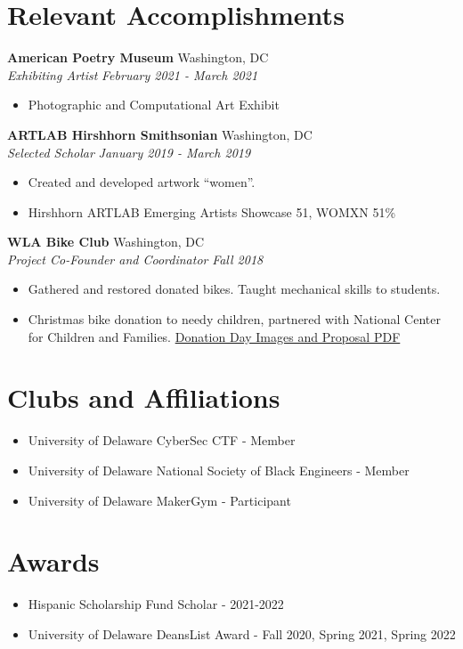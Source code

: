 \documentclass[letterpaper,10.5pt]{article}
\newcommand{\entry}[4]{%
  \vspace{2pt}
  \noindent\textbf{#1} \hfill #2 \\
  \noindent\textit{#3} \hfill \textit{#4}\par
  \vspace{-2pt}
}
\begin{document}
\section{Relevant Accomplishments}
\entry{American Poetry Museum}{Washington, DC}
      {Exhibiting Artist}{February 2021 - March 2021}
      \begin{itemize}
        \item Photographic and Computational Art Exhibit
      \end{itemize}
\entry{ARTLAB Hirshhorn Smithsonian}{Washington, DC}
      {Selected Scholar}{January 2019 - March 2019}
      \begin{itemize}
        \item Created and developed artwork “women”.
        \item Hirshhorn ARTLAB Emerging Artists Showcase 51, WOMXN 51\%
      \end{itemize}
\entry{WLA Bike Club}{Washington, DC}
      {Project Co-Founder and Coordinator}{Fall 2018}
      \begin{itemize}
        \item Gathered and restored donated bikes. Taught mechanical skills to students.
        \item Christmas bike donation to needy children, partnered with National Center for Children and Families. \href{https://drive.google.com/drive/folders/1Jjc7Jv8LeHK7yanB10Ws9KS3GHySGY8S}{Donation Day Images and Proposal PDF}
      \end{itemize}

\section{Clubs and Affiliations}
\begin{itemize}
  \item University of Delaware CyberSec CTF - Member
  \item University of Delaware National Society of Black Engineers - Member
  \item University of Delaware MakerGym - Participant
\end{itemize}

\section{Awards}
\begin{itemize}
  \item Hispanic Scholarship Fund Scholar - 2021-2022
  \item University of Delaware DeansList Award - Fall 2020, Spring 2021, Spring 2022
\end{itemize}
\end{document}
